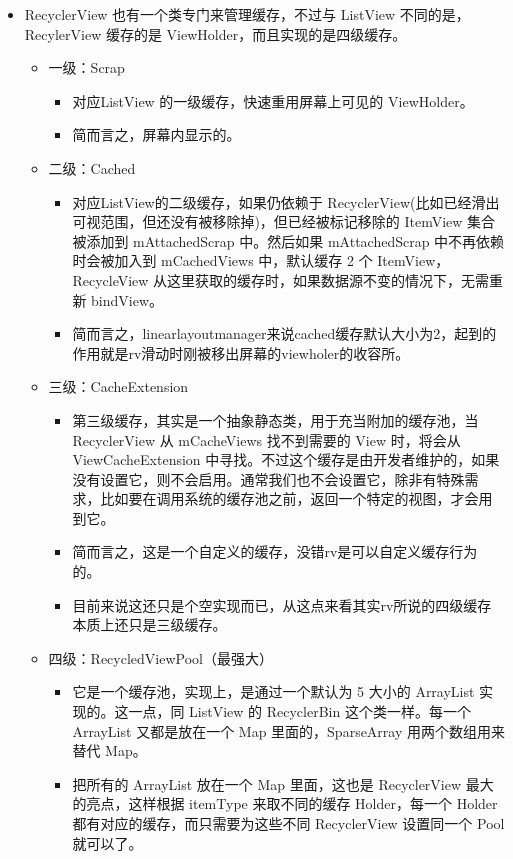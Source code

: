 \documentclass[9pt, b5paper]{article}
\begin{document}
\begin{itemize}
\item RecyclerView 也有一个类专门来管理缓存，不过与 ListView 不同的是，RecylerView 缓存的是 ViewHolder，而且实现的是四级缓存。
\begin{itemize}
\item 一级：Scrap
\begin{itemize}
\item 对应ListView 的一级缓存，快速重用屏幕上可见的 ViewHolder。
\item 简而言之，屏幕内显示的。
\end{itemize}
\item 二级：Cached
\begin{itemize}
\item 对应ListView的二级缓存，如果仍依赖于 RecyclerView(比如已经滑出可视范围，但还没有被移除掉)，但已经被标记移除的 ItemView 集合被添加到 mAttachedScrap 中。然后如果 mAttachedScrap 中不再依赖时会被加入到 mCachedViews 中，默认缓存 2 个 ItemView，RecycleView 从这里获取的缓存时，如果数据源不变的情况下，无需重新 bindView。
\item 简而言之，linearlayoutmanager来说cached缓存默认大小为2，起到的作用就是rv滑动时刚被移出屏幕的viewholer的收容所。
\end{itemize}
\item 三级：CacheExtension
\begin{itemize}
\item 第三级缓存，其实是一个抽象静态类，用于充当附加的缓存池，当 RecyclerView 从 mCacheViews 找不到需要的 View 时，将会从 ViewCacheExtension 中寻找。不过这个缓存是由开发者维护的，如果没有设置它，则不会启用。通常我们也不会设置它，除非有特殊需求，比如要在调用系统的缓存池之前，返回一个特定的视图，才会用到它。
\item 简而言之，这是一个自定义的缓存，没错rv是可以自定义缓存行为的。
\item 目前来说这还只是个空实现而已，从这点来看其实rv所说的四级缓存本质上还只是三级缓存。
\end{itemize}
\item 四级：RecycledViewPool（最强大）
\begin{itemize}
\item 它是一个缓存池，实现上，是通过一个默认为 5 大小的 ArrayList 实现的。这一点，同 ListView 的 RecyclerBin 这个类一样。每一个 ArrayList 又都是放在一个 Map 里面的，SparseArray 用两个数组用来替代 Map。
\item 把所有的 ArrayList 放在一个 Map 里面，这也是 RecyclerView 最大的亮点，这样根据 itemType 来取不同的缓存 Holder，每一个 Holder 都有对应的缓存，而只需要为这些不同 RecyclerView 设置同一个 Pool 就可以了。

\end{itemize}
\end{itemize}
\end{itemize}
\end{document}
